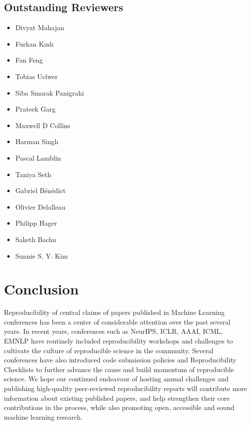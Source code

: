 \subsection{Outstanding Reviewers}

\begingroup
\fontsize{8pt}{8pt}\selectfont
\begin{multicols}{3}
\begin{itemize}[label={}]
\item Divyat Mahajan
\item Furkan Kınlı
\item Fan Feng
\item Tobias Uelwer
\item Siba Smarak Panigrahi
\item Prateek Garg
\item Maxwell D Collins
\item Harman Singh
\item Pascal Lamblin
\item Taniya Seth
\item Gabriel Bénédict
\item Olivier Delalleau
\item Philipp Hager
\item Saketh Bachu
\item Sunnie S. Y. Kim
\end{itemize}
\end{multicols}
\endgroup

\section{Conclusion}

Reproducibility of central claims of papers published in Machine Learning conferences has been a center of considerable attention over the past several years. In recent years, conferences such as NeurIPS, ICLR, AAAI, ICML, EMNLP have routinely included reproducibility
workshops and challenges to cultivate the culture of reproducible science in the community. Several conferences have also introduced code submission policies and Reproducibility Checklists to further advance the cause and build momentum of reproducible science. We hope our continued endeavour of hosting annual challenges and publishing high-quality peer-reviewed reproducibility reports will contribute more information about existing published papers, and help strengthen their core contributions in the process, while also promoting open, accessible and sound machine learning research.
